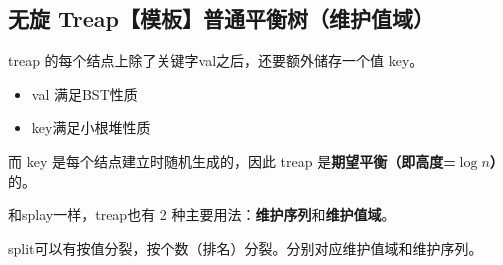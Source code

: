 \subsection{无旋 Treap【模板】普通平衡树（维护值域）}
\par \noindent treap 的每个结点上除了关键字val之后，还要额外储存一个值 key。
\begin{itemize}
\item val 满足BST性质
\item key满足小根堆性质
\end{itemize}
\par \noindent 而 key 是每个结点建立时随机生成的，因此 treap 是\textbf{期望平衡（即高度=$\log n$）}的。
~\\
\par \noindent 和splay一样，treap也有 2 种主要用法：\textbf{维护序列}和\textbf{维护值域}。
~\\
\par \noindent split可以有按值分裂，按个数（排名）分裂。分别对应维护值域和维护序列。
